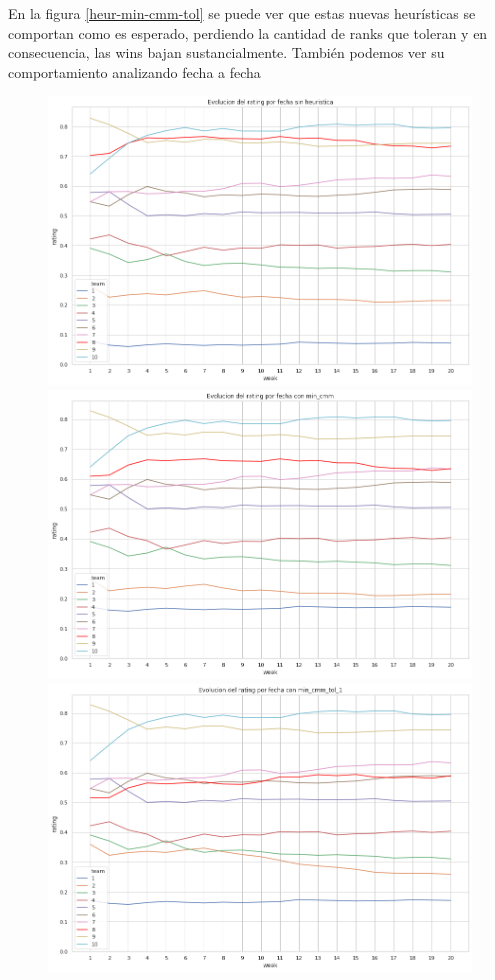 \documentclass[a4paper]{article}
\begin{document}
En la figura \ref{heur-min-cmm-tol} se puede ver que estas nuevas heurísticas se comportan como es esperado, perdiendo la cantidad de ranks que toleran y en consecuencia, las wins bajan sustancialmente. También podemos ver su comportamiento analizando fecha a fecha

\begin{figure}[H]
    \begin{center}
        \includegraphics[scale=0.25]{img/heur/evol-sin-heuristica.png}
        \includegraphics[scale=0.25]{img/heur/evol-min-cmm.png}
        \includegraphics[scale=0.25]{img/heur/evol-min-cmm-tol-1.png}

\end{center}
\end{figure}
\end{document}
